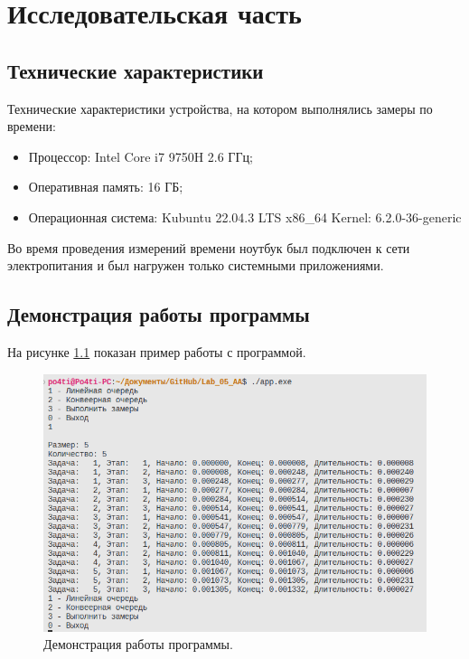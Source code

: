 \chapter{Исследовательская часть}

\section{Технические характеристики}
Технические характеристики устройства, на котором выполнялись
замеры по времени:

\begin{itemize}
    \item Процессор: Intel Core i7 9750H 2.6 ГГц;
    \item Оперативная память: 16 ГБ;
    \item Операционная система: Kubuntu 22.04.3 LTS x86\_64 Kernel: 6.2.0-36-generic
\end{itemize}

Во время проведения измерений времени ноутбук был подключен к сети электропитания и был нагружен только системными приложениями.

\section{Демонстрация работы программы}

На рисунке \ref{fig:img_prog} показан пример работы с программой.


\begin{figure}[ht!]
	\centering
	\includegraphics[width=170mm]{img/img_prog.png}
	\caption{Демонстрация работы программы.\label{overflow}}
	\label{fig:img_prog}
	\end{figure}



